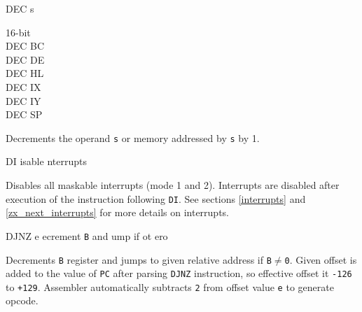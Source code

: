\begin{basedescript}{
	\desclabelstyle{\multilinelabel}
	\desclabelwidth{3cm}}
\begin{DetailItem}{DEC s}
\begin{DetailVariants}
			\columnbreak
			\textnormal{16-bit}\\
			DEC BC\\
			DEC DE\\
			DEC HL\\
			DEC IX\\
			DEC IY\\
			DEC SP
		\end{DetailVariants}

		Decrements the operand {\tt s} or memory addressed by {\tt s} by 1.

		\begin{DetailEffects}[v]
			\FlagsDECr[8-bit]
		\end{DetailEffects}
		
		\begin{DetailTiming}
		\end{DetailTiming}

	\end{DetailItem}

	\pagebreak
	\begin{DetailItem}{DI}
		{isable nterrupts}
		{\SymDI}

		Disables all maskable interrupts (mode 1 and 2). Interrupts are disabled after execution of the instruction following {\tt DI}. See sections \ref{interrupts} and \ref{zx_next_interrupts} for more details on interrupts.
		
		\begin{DetailEffects}
			\FlagsDI
		\end{DetailEffects}
				
		\begin{DetailTiming}
			\DetailTime{1}{4}
		\end{DetailTiming}

	\end{DetailItem}

	\begin{DetailItem}{DJNZ e}
		{ecrement {\tt B} and ump if ot \IH{Z}ero}
		{\SymDJNZ{e}}

		Decrements {\tt B} register and jumps to given relative address if {\tt B$\neq$0}. Given offset is added to the value of {\tt PC} after parsing {\tt DJNZ} instruction, so effective offset it {\tt -126} to {\tt +129}. Assembler automatically subtracts {\tt 2} from offset value {\tt e} to generate opcode.


\end{DetailItem}
\end{basedescript}
